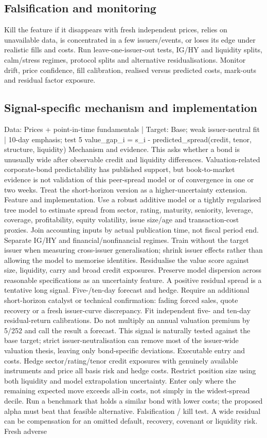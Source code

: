 \documentclass[10pt]{article}
\begin{document}
\subsection{Falsification and monitoring}
Kill the feature if it disappears with fresh independent prices, relies on unavailable data, is concentrated in a few issuers/events, or loses its edge under realistic fills and costs. Run leave-one-issuer-out tests, IG/HY and liquidity splits, calm/stress regimes, protocol splits and alternative residualisations. Monitor drift, price confidence, fill calibration, realised versus predicted costs, mark-outs and residual factor exposure.
\subsection{Signal-specific mechanism and implementation}
Data: Prices + point-in-time fundamentals  |  Target: Base; weak issuer-neutral fit  |  10-day emphasis; test 5 value\_gap\_i = s\_i - predicted\_spread(credit, tenor, structure, liquidity) Mechanism and evidence.  This asks whether a bond is unusually wide after observable credit and liquidity differences. Valuation-related corporate-bond predictability has published support, but book-to-market evidence is not validation of this peer-spread model or of convergence in one or two weeks. Treat the short-horizon version as a higher-uncertainty extension. Feature and implementation.  Use a robust additive model or a tightly regularised tree model to estimate spread from sector, rating, maturity, seniority, leverage, coverage, profitability, equity volatility, issue size/age and transaction-cost proxies. Join accounting inputs by actual publication time, not fiscal period end. Separate IG/HY and financial/nonfinancial regimes. Train without the target issuer when measuring cross-issuer generalisation; shrink issuer effects rather than allowing the model to memorise identities. Residualise the value score against size, liquidity, carry and broad credit exposures. Preserve model dispersion across reasonable specifications as an uncertainty feature. A positive residual spread is a tentative long signal. Five-/ten-day forecast and hedge.  Require an additional short-horizon catalyst or technical confirmation: fading forced sales, quote recovery or a fresh issuer-curve discrepancy. Fit independent five- and ten-day residual-return calibrations. Do not multiply an annual valuation premium by 5/252 and call the result a forecast. This signal is naturally tested against the base target; strict issuer-neutralisation can remove most of the issuer-wide valuation thesis, leaving only bond-specific deviations. Executable entry and costs.  Hedge sector/rating/tenor credit exposures with genuinely available instruments and price all basis risk and hedge costs. Restrict position size using both liquidity and model extrapolation uncertainty. Enter only where the remaining expected move exceeds all-in costs, not simply in the widest-spread decile. Run a benchmark that holds a similar bond with lower costs; the proposed alpha must beat that feasible alternative. Falsification / kill test.  A wide residual can be compensation for an omitted default, recovery, covenant or liquidity risk. Fresh adverse 
\end{document}

